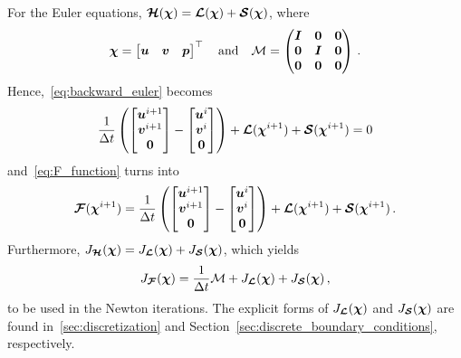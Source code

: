 For the Euler equations, $\bm{\mathcal{H}}(\bm{\chi}) = \bm{\mathcal{L}}(\bm{\chi}) + \bm{\mathcal{S}}(\bm{\chi})$, where
\[
  \bm{\chi} =
  \begin{bmatrix}
    \bm{u} & \bm{v} & \bm{p}
  \end{bmatrix}^\top
  \quad \text{and} \quad
  \mathcal{M} =
  \begin{pmatrix}
    \bm{I}    & \bm{0} & \bm{0} \\
    \bm{0} & \bm{I}    & \bm{0} \\
    \bm{0} & \bm{0} & \bm{0}
  \end{pmatrix}
  \,.
\]
Hence,~\eqref{eq:backward_euler} becomes
\begin{equation}
  \frac{1}{\Delta t} 
  \left(
    \begin{bmatrix}
      \un^{i+1} \\ \vn^{i+1} \\ \zeron
    \end{bmatrix}
    -
    \begin{bmatrix}
      \un^{i} \\ \vn^{i} \\ \zeron
    \end{bmatrix}
    \right)
    + \euln(\soln^{i+1}) + \satn(\soln^{i+1})
    = 0
  \label{eq:backward_euler_euler}
\end{equation}
and~\eqref{eq:F_function} turns into
\begin{equation}
  \Fn(\soln^{i+1}) = 
  \frac{1}{\Delta t} 
  \left(
    \begin{bmatrix}
      \un^{i+1} \\ \vn^{i+1} \\ \zeron
    \end{bmatrix}
    -
    \begin{bmatrix}
      \un^{i} \\ \vn^{i} \\ \zeron
    \end{bmatrix}
    \right)
    + \euln(\soln^{i+1}) + \satn(\soln^{i+1})
  \, .
  \label{eq:F_function_euler}
\end{equation}
Furthermore, $J_{\bm{\mathcal{H}}}(\bm{\chi}) = J_{\bm{\mathcal{L}}}(\bm{\chi}) + J_{\bm{\mathcal{S}}}(\bm{\chi})$, which yields
\begin{equation*}
  J_{\bm{\mathcal{F}}}(\bm{\chi}) =  
  \frac{1}{\Delta t}
  \mathcal{M}
  +
  J_{\bm{\mathcal{L}}}(\bm{\chi})
  +
  J_{\bm{\mathcal{S}}}(\bm{\chi})
  \, ,
\end{equation*}
to be used in the Newton iterations. The explicit forms of $J_{\bm{\mathcal{L}}}(\bm{\chi})$ and $J_{\bm{\mathcal{S}}}(\bm{\chi})$ are found in~\ref{sec:discretization} and Section~\ref{sec:discrete_boundary_conditions}, respectively.

